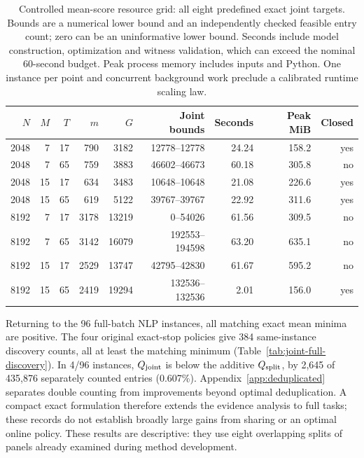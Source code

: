 \begin{table}[t]
\centering\small
\begin{tabular}{rrrrrrrrr}
\toprule
$N$ & $M$ & $T$ & $m$ & $G$ & Joint bounds & Seconds & Peak MiB & Closed\\
\midrule
2048 & 7 & 17 & 790 & 3182 & 12778--12778 & 24.24 & 158.2 & yes\\
2048 & 7 & 65 & 759 & 3883 & 46602--46673 & 60.18 & 305.8 & no\\
2048 & 15 & 17 & 634 & 3483 & 10648--10648 & 21.08 & 226.6 & yes\\
2048 & 15 & 65 & 619 & 5122 & 39767--39767 & 22.92 & 311.6 & yes\\
8192 & 7 & 17 & 3178 & 13219 & 0--54026 & 61.56 & 309.5 & no\\
8192 & 7 & 65 & 3142 & 16079 & 192553--194598 & 63.20 & 635.1 & no\\
8192 & 15 & 17 & 2529 & 13747 & 42795--42830 & 61.67 & 595.2 & no\\
8192 & 15 & 65 & 2419 & 19294 & 132536--132536 & 2.01 & 156.0 & yes\\
\bottomrule
\end{tabular}
\caption{Controlled mean-score resource grid: all eight predefined exact joint targets. Bounds are a numerical lower bound and an independently checked feasible entry count; zero can be an uninformative lower bound. Seconds include model construction, optimization and witness validation, which can exceed the nominal 60-second budget. Peak process memory includes inputs and Python. One instance per point and concurrent background work preclude a calibrated runtime scaling law.}
\label{tab:controlled-resource-grid}
\end{table}

Returning to the 96 full-batch NLP instances, all matching exact mean minima are positive. The four original exact-stop policies give 384 same-instance discovery counts, all at least the matching minimum (Table~\ref{tab:joint-full-discovery}). In 4/96 instances, $Q_{\rm joint}$ is below the additive $Q_{\rm split}$, by 2,645 of 435,876 separately counted entries (0.607\%). Appendix~\ref{app:deduplicated} separates double counting from improvements beyond optimal deduplication. A compact exact formulation therefore extends the evidence analysis to full tasks; these records do not establish broadly large gains from sharing or an optimal online policy. These results are descriptive: they use eight overlapping splits of panels already examined during method development.



